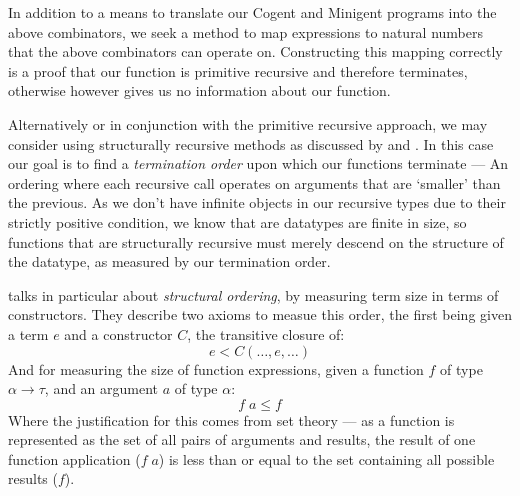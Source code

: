 In addition to a means to translate our Cogent and Minigent programs into the above combinators,
we seek a method to map expressions to natural numbers that the above combinators can
operate on. Constructing this mapping correctly is a proof that our function is primitive recursive and
therefore terminates, otherwise however gives us no information about our function.

Alternatively or in conjunction with the primitive recursive approach, we may consider using
structurally recursive methods as discussed by \citet{StrucrecStructures} and \citet{PredicateStructrec}.
In this case our goal is to find a \textit{termination order} upon which our functions terminate --- An ordering
where each recursive call operates on arguments that are `smaller' than the previous. 
As we don't have infinite objects in our recursive types due to their strictly positive condition, 
we know that are datatypes are finite in size, so functions that are  structurally recursive must
merely descend on the structure of the datatype, as measured by our termination order.

\citet{PredicateStructrec} talks in particular about \textit{structural ordering}, by measuring term size in
terms of constructors. They describe two axioms to measue this order, the first being given
a term $e$ and a constructor $C$, the transitive closure of:
$$
    e < C (\dots, e, \dots)
$$
And for measuring the size of function expressions, given a function $f$ of type $\alpha \longrightarrow \tau$,
and an argument $a$ of type $\alpha$:
$$
    f\; a \leq f
$$
Where the justification for this comes from set theory --- as a function is represented as the set of all pairs of
arguments and results, the result of one function application ($f\; a$) is less than or equal to the set containing
all possible results ($f$).

